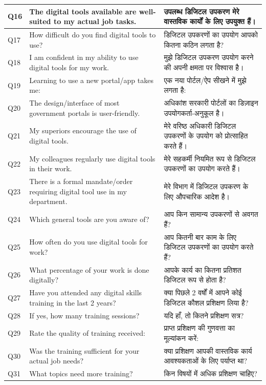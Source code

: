 \documentclass[11pt,a4paper]{article}
\begin{document}
\begin{longtable}{|p{1cm}|p{6cm}|p{6cm}|}
Q16 & The digital tools available are well-suited to my actual job tasks. & उपलब्ध डिजिटल उपकरण मेरे वास्तविक कार्यों के लिए उपयुक्त हैं। \\ \hline
Q17 & How difficult do you find digital tools to use? & डिजिटल उपकरणों का उपयोग आपको कितना कठिन लगता है? \\ \hline
Q18 & I am confident in my ability to use digital tools for my work. & मुझे डिजिटल उपकरण उपयोग करने की अपनी क्षमता पर विश्वास है। \\ \hline
Q19 & Learning to use a new portal/app takes me: & एक नया पोर्टल/ऐप सीखने में मुझे लगता है: \\ \hline
Q20 & The design/interface of most government portals is user-friendly. & अधिकांश सरकारी पोर्टलों का डिज़ाइन उपयोगकर्ता-अनुकूल है। \\ \hline
Q21 & My superiors encourage the use of digital tools. & मेरे वरिष्ठ अधिकारी डिजिटल उपकरणों के उपयोग को प्रोत्साहित करते हैं। \\ \hline
Q22 & My colleagues regularly use digital tools in their work. & मेरे सहकर्मी नियमित रूप से डिजिटल उपकरणों का उपयोग करते हैं। \\ \hline
Q23 & There is a formal mandate/order requiring digital tool use in my department. & मेरे विभाग में डिजिटल उपकरण के लिए औपचारिक आदेश है। \\ \hline
Q24 & Which general tools are you aware of? & आप किन सामान्य उपकरणों से अवगत हैं? \\ \hline
Q25 & How often do you use digital tools for work? & आप कितनी बार काम के लिए डिजिटल उपकरणों का उपयोग करते हैं? \\ \hline
Q26 & What percentage of your work is done digitally? & आपके कार्य का कितना प्रतिशत डिजिटल रूप से होता है? \\ \hline
Q27 & Have you attended any digital skills training in the last 2 years? & क्या पिछले 2 वर्षों में आपने कोई डिजिटल कौशल प्रशिक्षण लिया है? \\ \hline
Q28 & If yes, how many training sessions? & यदि हाँ, तो कितने प्रशिक्षण सत्र? \\ \hline
Q29 & Rate the quality of training received: & प्राप्त प्रशिक्षण की गुणवत्ता का मूल्यांकन करें: \\ \hline
Q30 & Was the training sufficient for your actual job needs? & क्या प्रशिक्षण आपकी वास्तविक कार्य आवश्यकताओं के लिए पर्याप्त था? \\ \hline
Q31 & What topics need more training? & किन विषयों में अधिक प्रशिक्षण चाहिए? \\ \hline

\end{longtable}
\end{document}
